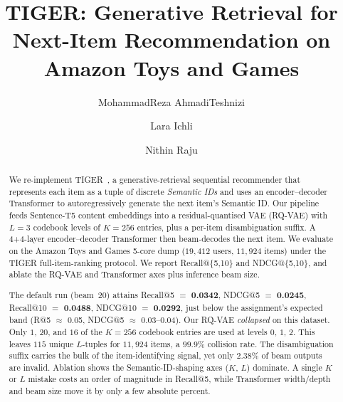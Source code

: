 \documentclass[sigconf]{acmart}
\begin{document}
\title{TIGER: Generative Retrieval for Next-Item Recommendation on Amazon
       Toys and Games}

\author{MohammadReza AhmadiTeshnizi}

\author{Lara Ichli}

\author{Nithin Raju}

\begin{abstract}
We re-implement TIGER~\cite{rajput2023tiger}, a generative-retrieval
sequential recommender that represents each item as a tuple of
discrete \emph{Semantic IDs} and uses an encoder--decoder Transformer
to autoregressively generate the next item's Semantic ID.  Our
pipeline feeds Sentence-T5 content embeddings into a residual-quantised
VAE (RQ-VAE) with $L{=}3$ codebook levels of $K{=}256$ entries, plus
a per-item disambiguation suffix.  A 4+4-layer encoder--decoder
Transformer then beam-decodes the next item.  We evaluate on the
Amazon Toys and Games 5-core dump ($19{,}412$ users, $11{,}924$ items)
under the TIGER full-item-ranking protocol.  We report
Recall@\{5,10\} and NDCG@\{5,10\}, and ablate the RQ-VAE and
Transformer axes plus inference beam size.

The default run (beam~$20$) attains Recall@5 $=$ \textbf{0.0342},
NDCG@5 $=$ \textbf{0.0245}, Recall@10 $=$ \textbf{0.0488}, NDCG@10
$=$ \textbf{0.0292}, just below the assignment's expected band
(R@5 $\approx$ 0.05, NDCG@5 $\approx$ 0.03--0.04).  Our RQ-VAE
\emph{collapsed} on this dataset.  Only $1$, $20$, and $16$ of the
$K{=}256$ codebook entries are used at levels $0$, $1$, $2$.  This
leaves $115$ unique $L$-tuples for $11{,}924$ items, a $99.9\%$
collision rate.  The
disambiguation suffix carries the bulk of the item-identifying signal,
yet only $2.38\%$ of beam outputs are invalid.  Ablation shows the
Semantic-ID-shaping axes ($K$, $L$) dominate. A single $K$ or $L$
mistake costs an order of magnitude in Recall@5, while Transformer
width/depth and beam size move it by only a few absolute percent.
\end{abstract}
\end{document}
